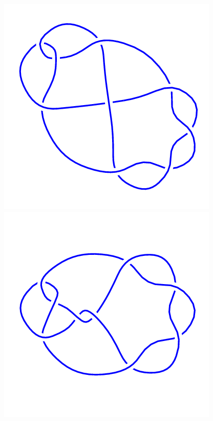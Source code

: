 \begin{figure}[H]
	\begin{minipage}[b]{.18\linewidth}
		\centering
		\includegraphics[width=\linewidth]{../data/9_11.png}
	\end{minipage}
	\begin{minipage}[b]{.18\linewidth}
		\centering
		\includegraphics[width=\linewidth]{../data/9_12.png}

\end{minipage}
\end{figure}
